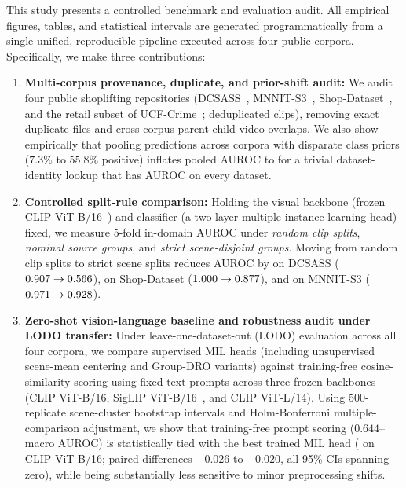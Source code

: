 \documentclass[pdflatex,sn-mathphys-num]{sn-jnl}
\begin{document}
This study presents a controlled benchmark and evaluation audit. All empirical figures, tables, and statistical intervals are generated programmatically from a single unified, reproducible pipeline executed across four public corpora. Specifically, we make three contributions:
\begin{enumerate}
    \item \textbf{Multi-corpus provenance, duplicate, and prior-shift audit:} We audit four public shoplifting repositories (DCSASS~\cite{dcsass}, MNNIT-S3~\cite{ansari2022esar,mnnitmendeley,mnnitkaggle}, Shop-Dataset~\cite{shopkaggle}, and the retail subset of UCF-Crime~\cite{sultani2018}; \TotalClips{} deduplicated clips), removing \DupTotal{} exact duplicate files and \ParentUCF{} cross-corpus parent-child video overlaps. We also show empirically that pooling predictions across corpora with disparate class priors ($7.3\%$ to $55.8\%$ positive) inflates pooled AUROC to \PooledAUROCID{} for a trivial dataset-identity lookup that has \MacroAUROCID{} AUROC on every dataset.
    \item \textbf{Controlled split-rule comparison:} Holding the visual backbone (frozen CLIP ViT-B/16~\cite{radford2021}) and classifier (a two-layer multiple-instance-learning head) fixed, we measure 5-fold in-domain AUROC under \emph{random clip splits}, \emph{nominal source groups}, and \emph{strict scene-disjoint groups}. Moving from random clip splits to strict scene splits reduces AUROC by \DCSASSDrop{} on DCSASS ($0.907{} \to 0.566{}$), \ShopDrop{} on Shop-Dataset ($1.000{} \to 0.877{}$), and \MNNITDrop{} on MNNIT-S3 ($0.971{} \to 0.928{}$).
    \item \textbf{Zero-shot vision-language baseline and robustness audit under LODO transfer:} Under leave-one-dataset-out (LODO) evaluation across all four corpora, we compare supervised MIL heads (including unsupervised scene-mean centering and Group-DRO variants) against training-free cosine-similarity scoring using fixed text prompts across three frozen backbones (CLIP ViT-B/16, SigLIP ViT-B/16~\cite{zhai2023}, and CLIP ViT-L/14). Using 500-replicate scene-cluster bootstrap intervals and Holm-Bonferroni multiple-comparison adjustment, we show that training-free prompt scoring ($0.644$--\BestZSMacro{} macro AUROC) is statistically tied with the best trained MIL head (\BestTRMacro{} on CLIP ViT-B/16; paired differences $-0.026$ to $+0.020$, all 95\% CIs spanning zero), while being substantially less sensitive to minor preprocessing shifts.
\end{enumerate}
\end{document}
